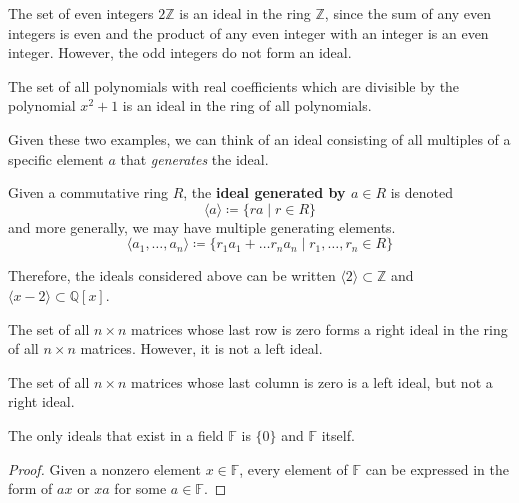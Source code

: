     \begin{example}
      The set of even integers $2 \mathbb{Z}$ is an ideal in the ring $\mathbb{Z}$, since the sum of any even integers is even and the product of any even integer with an integer is an even integer. However, the odd integers do not form an ideal. 
    \end{example}

    \begin{example}
      The set of all polynomials with real coefficients which are divisible by the polynomial $x^2 + 1$ is an ideal in the ring of all polynomials. 
    \end{example} 

    Given these two examples, we can think of an ideal consisting of all multiples of a specific element $a$ that \textit{generates} the ideal. 

    \begin{definition}
      Given a commutative ring $R$, the \textbf{ideal generated by $a \in R$} is denoted 
      \begin{equation}
        \langle a \rangle \coloneqq \{r a \mid r \in R\}
      \end{equation}
      and more generally, we may have multiple generating elements. 
      \begin{equation}
        \langle a_1, \ldots, a_n \rangle \coloneqq \{ r_1 a_1 + \ldots r_n a_n \mid r_1, \ldots, r_n \in R \}
      \end{equation}
    \end{definition}

    Therefore, the ideals considered above can be written $\langle 2 \rangle \subset \mathbb{Z}$ and $\langle x - 2 \rangle \subset \mathbb{Q}[x]$. 

    \begin{example}
      The set of all $n \times n$ matrices whose last row is zero forms a right ideal in the ring of all $n \times n$ matrices. However, it is not a left ideal.

      The set of all $n\times n$ matrices whose last column is zero is a left ideal, but not a right ideal. 
    \end{example}

    \begin{theorem}
      The only ideals that exist in a field $\mathbb{F}$ is $\{0\}$ and $\mathbb{F}$ itself. 
    \end{theorem}
    \begin{proof}
      Given a nonzero element $x \in \mathbb{F}$, every element of $\mathbb{F}$ can be expressed in the form of $a x$ or $x a$ for some $a \in \mathbb{F}$. 
    \end{proof}

